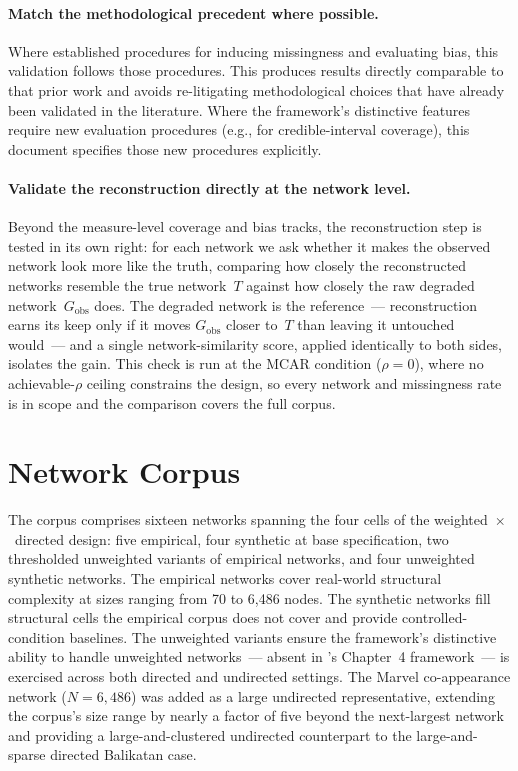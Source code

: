 \documentclass[11pt]{article}
\newcommand{\Gobs}{G_{\text{obs}}}
\begin{document}
\paragraph{Match the methodological precedent where possible.} Where \citet{SmithMorganMoody2022} established procedures for inducing missingness and evaluating bias, this validation follows those procedures. This produces results directly comparable to that prior work and avoids re-litigating methodological choices that have already been validated in the literature. Where the framework's distinctive features require new evaluation procedures (e.g., for credible-interval coverage), this document specifies those new procedures explicitly.

\paragraph{Validate the reconstruction directly at the network level.} Beyond the measure-level coverage and bias tracks, the reconstruction step is tested in its own right: for each network we ask whether it makes the observed network look more like the truth, comparing how closely the reconstructed networks resemble the true network~$T$ against how closely the raw degraded network~$\Gobs$ does. The degraded network is the reference~--- reconstruction earns its keep only if it moves $\Gobs$ closer to~$T$ than leaving it untouched would~--- and a single network-similarity score, applied identically to both sides, isolates the gain. This check is run at the MCAR condition ($\rho = 0$), where no achievable-$\rho$ ceiling constrains the design, so every network and missingness rate is in scope and the comparison covers the full corpus.

\section{Network Corpus}

The corpus comprises sixteen networks spanning the four cells of the weighted~$\times$~directed design: five empirical, four synthetic at base specification, two thresholded unweighted variants of empirical networks, and four unweighted synthetic networks. The empirical networks cover real-world structural complexity at sizes ranging from 70 to 6{,}486 nodes. The synthetic networks fill structural cells the empirical corpus does not cover and provide controlled-condition baselines. The unweighted variants ensure the framework's distinctive ability to handle unweighted networks~--- absent in \citet{Bellutta2026}'s Chapter~4 framework~--- is exercised across both directed and undirected settings. The Marvel co-appearance network ($N = 6{,}486$) was added as a large undirected representative, extending the corpus's size range by nearly a factor of five beyond the next-largest network and providing a large-and-clustered undirected counterpart to the large-and-sparse directed Balikatan case.
\end{document}
